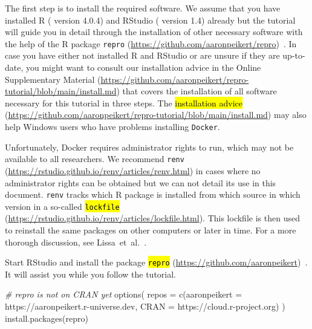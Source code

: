 \documentclass[psych,tutorial,accept,moreauthors,pdftex]{Definitions/mdpi}
\newenvironment{Shaded}{\begin{snugshade}}{\end{snugshade}}
\newcommand{\AttributeTok}[1]{\textcolor[rgb]{0.77,0.63,0.00}{#1}}
\newcommand{\CommentTok}[1]{\textcolor[rgb]{0.56,0.35,0.01}{\textit{#1}}}
\newcommand{\FunctionTok}[1]{\textcolor[rgb]{0.00,0.00,0.00}{#1}}
\newcommand{\NormalTok}[1]{#1}
\newcommand{\StringTok}[1]{\textcolor[rgb]{0.31,0.60,0.02}{#1}}
\begin{document}
The first step is to install the required software. We assume that you
have installed R (\citep{R-base} version 4.0.4) and RStudio
(\citep{rstudio} version 1.4) already but the tutorial will guide you in
detail through the installation of other necessary software with the
help of the R package {\texttt{repro}} 
(\url{https://github.com/aaronpeikert/repro})~\citep{R-repro}. In case you have either not installed R and RStudio or
are unsure if they are up-to-date, you might want to consult our
installation advice in the Online Supplementary Material
(\url{https://github.com/aaronpeikert/repro-tutorial/blob/main/install.md}) that covers the installation of all software
necessary for this tutorial in three steps. The
\hl{installation advice}
(\url{https://github.com/aaronpeikert/repro-tutorial/blob/main/install.md}) may also help Windows users who have problems installing
\texttt{Docker}.

Unfortunately, Docker requires administrator rights to run, which may
not be available to all researchers. We recommend {\texttt{renv}}
(\url{https://rstudio.github.io/renv/articles/renv.html})
\citep{R-renv} in cases where no administrator rights can be obtained
but we can not detail its use in this document. \texttt{renv} tracks which
R package is installed from which source in which version in a so-called \hl{\texttt{lockfile}}
(\url{https://rstudio.github.io/renv/articles/lockfile.html}).
This lockfile is then used to reinstall the same packages on other
computers or later in time. For a more thorough discussion, see
Lissa~et~al.~\citep{vanlissa2020worcs}.

Start RStudio and install the package \hl{\texttt{repro}}
(\url{https://github.com/aaronpeikert})~\citep{R-repro}.
It will assist you while you follow the tutorial.

\begin{adjustwidth}{0.5cm}{0cm} 
\begin{Shaded}
\begin{Highlighting}[]
\CommentTok{\# repro is not on CRAN yet}
\FunctionTok{options}\NormalTok{(}
  \AttributeTok{repos =} \FunctionTok{c}\NormalTok{(}\AttributeTok{aaronpeikert =} \StringTok{\textquotesingle{}https://aaronpeikert.r{-}universe.dev\textquotesingle{}}\NormalTok{,}
            \AttributeTok{CRAN =} \StringTok{\textquotesingle{}https://cloud.r{-}project.org\textquotesingle{}}\NormalTok{)}
\NormalTok{)}
\FunctionTok{install.packages}\NormalTok{(}\StringTok{\textquotesingle{}repro\textquotesingle{}}\NormalTok{)}
\end{Highlighting}
\end{Shaded}
\end{adjustwidth}
\end{document}

